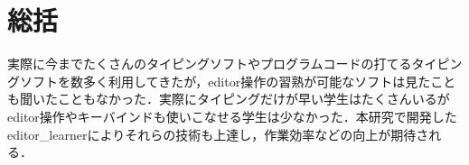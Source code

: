 \chapter{総括}\label{ux7dcfux62ec}

    実際に今までたくさんのタイピングソフトやプログラムコードの打てるタイピングソフトを数多く利用してきたが，editor操作の習熟が可能なソフトは見たことも聞いたこともなかった．実際にタイピングだけが早い学生はたくさんいるがeditor操作やキーバインドも使いこなせる学生は少なかった．本研究で開発したeditor\_learnerによりそれらの技術も上達し，作業効率などの向上が期待される．

    